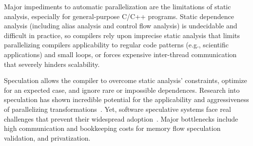 Major impediments to automatic parallelization are the limitations of static
analysis, especially for general-purpose C/C++ programs. Static dependence
analysis (including alias analysis and control flow analysis) is undecidable and
difficult in practice, so compilers rely upon imprecise static analysis that
limits parallelizing compilers applicability to regular code patterns (e.g.,
scientific applications) and small loops, or forces expensive inter-thread
communication that severely hinders scalability.
%
%

%
%

Speculation allows the compiler to overcome static analysis' constraints,
optimize for an expected
case, and ignore rare or impossible dependences.  Research into speculation has
shown incredible potential for the applicability and aggressiveness of
parallelizing transformations~\cite{zhong:08:hpca, johnson:12:pldi:short}.
%
%
Yet, software speculative systems face real challenges that prevent their
widespread adoption~\cite{cascaval:08:stmtoy:short, .., ..}.
Major bottlenecks include high communication and bookkeeping costs for memory
flow speculation validation,
and privatization.

